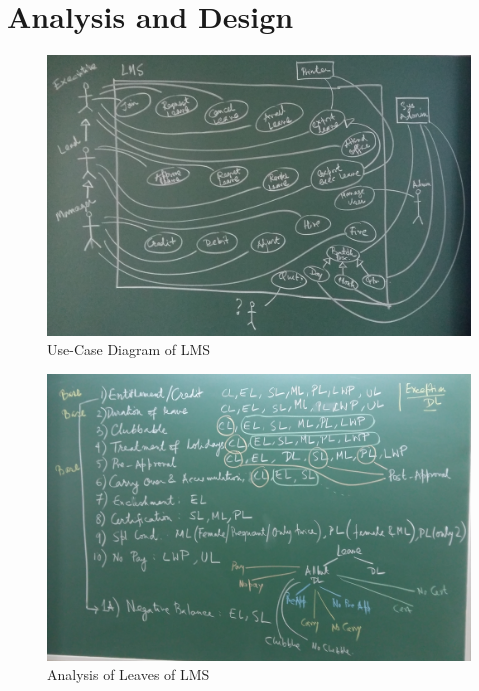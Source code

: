 \documentclass{article}
\begin{document}
\begin{footnotesize}
\begin{enumerate}
\begin{enumerate}
\end{enumerate}
\end{enumerate}
\end{footnotesize}

\newpage
\section*{Analysis and Design}
\begin{figure}[ht]
\centering
\includegraphics[width=12cm]{Images/Use-Case.jpg}
\caption{Use-Case Diagram of LMS
\label{fig:use-case}
}
\end{figure}

\newpage
\begin{figure}[ht]
\centering
\includegraphics[width=12cm]{Images/Leave_Attributes.jpg}
\caption{Analysis of Leaves of LMS
\label{fig:use-case}
}
\end{figure}
\end{document}
